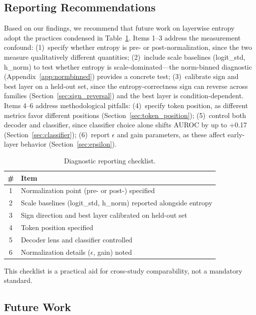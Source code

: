 \documentclass{ieeeaccess}
\begin{document}
\FloatBarrier
\subsection{Reporting Recommendations}
\label{sec:recommendations}

Based on our findings, we recommend that future work on layerwise entropy adopt the practices condensed in Table~\ref{tab:checklist}. Items 1--3 address the measurement confound: (1)~specify whether entropy is pre- or post-normalization, since the two measure qualitatively different quantities; (2)~include scale baselines (logit\_std, h\_norm) to test whether entropy is scale-dominated---the norm-binned diagnostic (Appendix~\ref{app:normbinned}) provides a concrete test; (3)~calibrate sign and best layer on a held-out set, since the entropy-correctness sign can reverse across families (Section~\ref{sec:sign_reversal}) and the best layer is condition-dependent. Items 4--6 address methodological pitfalls: (4)~specify token position, as different metrics favor different positions (Section~\ref{sec:token_position}); (5)~control both decoder and classifier, since classifier choice alone shifts AUROC by up to +0.17 (Section~\ref{sec:classifier}); (6)~report $\epsilon$ and gain parameters, as these affect early-layer behavior (Section~\ref{sec:epsilon}).

\begin{table}[!ht]
\centering
\caption{Diagnostic reporting checklist.}
\label{tab:checklist}
\begin{tabular}{c l}
\toprule
\# & Item \\
\midrule
1 & Normalization point (pre- or post-) specified \\
2 & Scale baselines (logit\_std, h\_norm) reported alongside entropy \\
3 & Sign direction and best layer calibrated on held-out set \\
4 & Token position specified \\
5 & Decoder lens and classifier controlled \\
6 & Normalization details ($\epsilon$, gain) noted \\
\bottomrule
\end{tabular}
\end{table}

This checklist is a practical aid for cross-study comparability, not a mandatory standard.

\FloatBarrier
\subsection{Future Work}
\label{sec:future}
\end{document}
